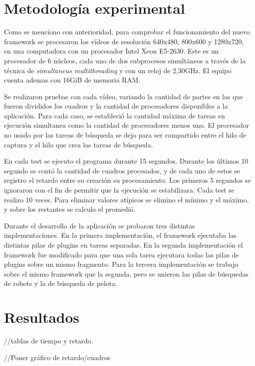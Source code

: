 
\section{Metodología experimental}

Como se menciono con anterioridad, para comprobar el funcionamiento del nuevo
framework se procesaron los vídeos de resolución 640x480, 800x600 y 1280x720, en
una computadora con un procesador Intel Xeon E5-2630. Este es un procesador de 6
núcleos, cada uno de dos subprocesos simultáneos a través de la técnica de
\emph{simultaneus multithreading} y con un reloj de 2,30GHz. El equipo cuenta
ademas con 16GiB de memoria RAM.

Se realizaron pruebas con cada vídeo, variando la cantidad de partes en las que
fueron divididos los cuadros y la cantidad de procesadores disponibles a la
aplicación. Para cada caso, se estableció la cantidad máxima de tareas en
ejecución simultanea como la cantidad de procesadores menos uno. El procesador
no usado por las tareas de búsqueda se dejo para ser compartido entre el hilo de
captura y el hilo que crea las tareas de búsqueda.

En cada test se ejecuto el programa durante 15 segundos. Durante los últimos 10
segundo se contó la cantidad de cuadros procesados, y de cada uno de estos se
registro el retardo entre su creación su procesamiento. Los primeros 5 segundos
se ignoraron con el fin de permitir que la ejecución se estabilizara. Cada test
se realizo 10 veces. Para eliminar valores atípicos se elimino el mínimo y el
máximo, y sobre los restantes se calculo el promedió.

Durante el desarrollo de la aplicación se probaron tres distintas
implementaciones. En la primera implementación, el framework ejecutaba las
distintas pilas de plugins en tareas separadas. En la segunda implementación el
framework fue modificado para que una sola tarea ejecutara todas las pilas de
plugins sobre un mismo fragmento. Para la tercera implementación se trabajo
sobre el mismo framework que la segunda, pero se unieron las pilas de búsquedas
de robots y la de búsqueda de pelota.

\section{Resultados}

//tablas de tiempo y retardo.

//Poner gráfico de retardo/cuadros
